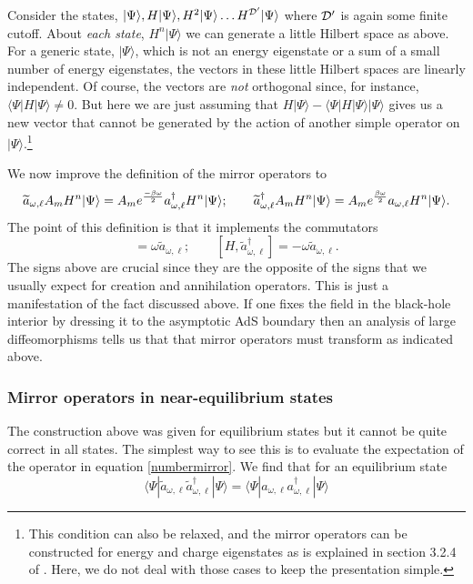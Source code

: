 \documentclass[12pt]{article}
\newcommand{\cop}[1]{#1}
\newcommand{\al}{\cop{A}} %
\def\ta{\widetilde{\cop{a}}}
\newcommand{\be}{\begin{equation}}
\newcommand{\ee}{\end{equation}}
\begin{document}
Consider the states, $|\Psi \rangle, H |\Psi \rangle, H^2 |\Psi \rangle \ldots H^{\cal D'} |\Psi \rangle$ where ${\cal D}'$ is again some finite cutoff. About {\em each state}, $H^n |\Psi \rangle$ we can generate a little Hilbert space as above. For a generic state, $|\Psi \rangle$, which is not an energy eigenstate or a sum of a small number of energy eigenstates, the vectors in these little Hilbert spaces are linearly independent. Of course, the vectors are {\em not} orthogonal since, for instance, $\langle \Psi | H |\Psi \rangle \neq 0$. But here we are just assuming that $H |\Psi \rangle - \langle \Psi| H  | \Psi \rangle |\Psi \rangle$ gives us a new vector that cannot be generated by the action of another simple operator on $|\Psi \rangle$.\footnote{This condition can also be relaxed, and the mirror operators can be constructed for energy and charge eigenstates as is explained in section 3.2.4 of  \cite{Papadodimas:2013jku}. Here, we do not deal with those cases to keep the presentation simple.}
  
We now improve the definition of the mirror operators to
\be
\label{acthn}
\ta_{\omega, \ell} \al_m H^n |\Psi \rangle = \al_m e^{-\beta \omega \over 2} a_{\omega, \ell}^{\dagger} H^n |\Psi \rangle; \qquad \ta_{\omega, \ell}^{\dagger} \al_m H^n |\Psi \rangle = \al_m e^{\beta \omega \over 2} a_{\omega, \ell} H^n |\Psi \rangle.
\ee
The point of this definition is that it implements the commutators
\be
[H, \ta_{\omega, \ell}] = \omega \ta_{\omega, \ell}; \qquad [H, \ta_{\omega, \ell}^{\dagger}] = -\omega \ta_{\omega, \ell}.
\ee
The signs above are crucial since they are the opposite of the signs that we usually expect for creation and annihilation operators. This is just a manifestation of the fact discussed above. If one fixes the field in the black-hole interior by dressing it to the asymptotic AdS boundary then an analysis of large diffeomorphisms tells us that that mirror operators must transform as indicated above.

\subsubsection{\bf Mirror operators in near-equilibrium states}
The construction above was given for equilibrium states but it cannot be quite correct in all states. The simplest way to see this is to evaluate the expectation of the operator in equation \eqref{numbermirror}. We find that for an equilibrium state
\be
\label{notalwayseq}
\langle \Psi | \ta_{\omega, \ell} \ta_{\omega, \ell}^{\dagger} |\Psi \rangle = \langle \Psi | a_{\omega, \ell} a_{\omega, \ell}^{\dagger} |\Psi \rangle
\ee
\end{document}
